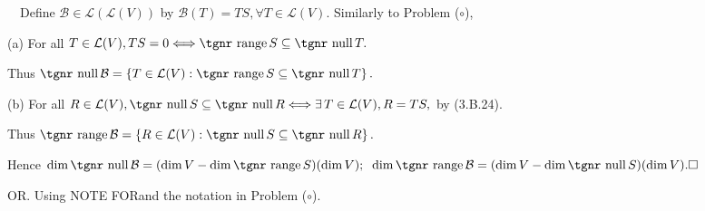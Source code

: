 \documentclass[a4paper, 11pt, UTF8]{article}
\def\range{{\textup{\tgnr range}}\,}
\def\null{{\textup{\tgnr null}}\,}
\def\Lm{\mathcal{L}}
\def\BulletPoint{{\small\bullet}}
\def\Ha{{\large\Blind{(a) }}}
\def\Hb{{\large\Blind{(b) }}}
\def\Or{{\large O{\footnotesize R.} }}
\def\NOTEFOR{{\tgnr\large N{\footnotesize OTE} F{\footnotesize OR}}}
\begin{document}
\begin{large}
\BulletPoint \,\hspace{1pt}\Comment\,\,\, {\Large\vspace{6pt}Define $\mathcal{B}\in\Lm\left(\Lm(V)\right)$ by $\mathcal{B}(T)=TS,\forall T\in\Lm(V).$ Similarly to Problem ($\circ$),}\par\quad
(a) {\Large\vspace{3pt}For all $T\in\Lm(V),TS=0\Longleftrightarrow\range S\subseteq\null T.$}\par\quad\Ha
{\Large\vspace{6pt}Thus $\null\mathcal{B}=\left\{T\in\Lm(V):\range S\subseteq\null T\right\}.$}\par\quad
(b) {\Large\vspace{3pt}For all $R\in\Lm(V),\null S\subseteq\null R\Longleftrightarrow\exists\,T\in\Lm(V),R=TS,$ by (3.B.24).}\par\quad\Hb
{\Large\vspace{6pt}Thus $\range\mathcal{B}=\left\{R\in\Lm(V):\null S\subseteq\null R\right\}.$}\par\quad
Hence $\dim\null\mathcal{B}=(\dim V-\dim\range S)(\dim V);\;\;\dim\range\mathcal{B}=(\dim V-\dim\null S)(\dim V).\hfill\square$\vspace{16pt}\par\quad
\Or Using \NOTEFOR\;[3.60] and the notation in Problem ($\circ$).\par
{\Large{}}\vspace{-70pt}\par\quad

\end{large}
\end{document}
